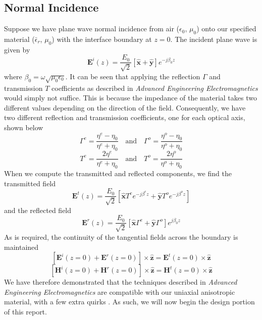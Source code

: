 \documentclass{optica-article}
\newcommand{\bv}[1]{\mathbf{#1}}
\begin{document}
\subsection{Normal Incidence}
Suppose we have plane wave normal incidence from air ($\epsilon_0$, $\mu_0$) onto
our specified material ($\bar{\epsilon}_r$, $\mu_0$) with the interface boundary
at $z=0$. The incident plane wave is given by
\begin{equation}\label{eq:NI_Ei}
  \bv{E}^i(z) = \frac{E_0}{\sqrt{2}}\left[\bv{\hat{x}} + \bv{\hat{y}}\right]
  e^{-j\beta_0 z}
\end{equation}
where $\beta_0 = \omega\sqrt{\mu_0\epsilon_0}$. It can be seen that
applying the reflection $\Gamma$ and transmission $T$ coefficients as described
in \textit{Advanced Engineering Electromagnetics} would simply not suffice.
This is because the impedance of the material takes two different values
depending on the direction of the field. Consequently, we have two different
reflection and transmission coefficients, one for each optical axis, shown
below
\begin{equation}\label{eq:Gamma}
  \Gamma^e = \frac{\eta^e-\eta_0}{\eta^e + \eta_0}
  \quad\text{and}\quad
  \Gamma^o = \frac{\eta^o-\eta_0}{\eta^o + \eta_0}
\end{equation}
\begin{equation}\label{eq:T}
  T^e = \frac{2\eta^e}{\eta^e + \eta_0}
  \quad\text{and}\quad
  T^o = \frac{2\eta^o}{\eta^o + \eta_0}
\end{equation}
When we compute the transmitted and reflected components, we find the 
transmitted field
\begin{equation}\label{eq:NI_Et}
  \bv{E}^t(z) = \frac{E_0}{\sqrt{2}}\left[\bv{\hat{x}}T^ee^{-j\beta^e z}
   + \bv{\hat{y}}T^oe^{-j\beta^o z}\right]
\end{equation}
and the reflected field
\begin{equation}\label{eq:NI_Er}
  \bv{E}^r(z) = \frac{E_0}{\sqrt{2}}\left[\bv{\hat{x}}\Gamma^e
   + \bv{\hat{y}}\Gamma^o\right]e^{j\beta_0 z}
\end{equation}
As is required, the continuity of the tangential
fields across the boundary is maintained
\begin{equation}\label{eq:NI_cont}
  \left[\bv{E}^i(z=0) + \bv{E}^r(z=0)\right]\times \bv{\hat{z}} = 
  \bv{E}^t(z=0)\times \bv{\hat{z}}
\end{equation}
\begin{equation}\label{eq:NI_cont}
  \left[\bv{H}^i(z=0) + \bv{H}^r(z=0)\right]\times \bv{\hat{z}} = 
  \bv{H}^t(z=0)\times \bv{\hat{z}}
\end{equation}
We have therefore demonstrated that the techniques described in 
\textit{Advanced Engineering Electromagnetics} are compatible with our 
uniaxial anisotropic material, with a few extra quirks \cite{Balanis-2012}. 
As such, we will now
begin the design portion of this report.
\end{document}
